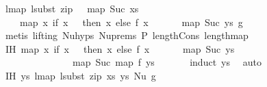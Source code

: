 \begin{isabellebody}
\ lmap\ {\isacharparenleft}{\kern0pt}lsubst\ {\isacharparenleft}{\kern0pt}zip\ {\isacharparenleft}{\kern0pt}{}\ {\isacharhash}{\kern0pt}\ map\ Suc\ xs{\isacharparenright}{\kern0pt}\isanewline
\ \ \ \ {\isacharparenleft}{\kern0pt}map\ {\isacharparenleft}{\kern0pt}{\isasymlambda}x{\isachardot}{\kern0pt}\ if\ x\ {\isacharequal}{\kern0pt}\ {}\ then\ x\ else\ {\isacharparenleft}{\kern0pt}f\ {\isacharparenleft}{\kern0pt}x\ {\isacharminus}{\kern0pt}\ {}{\isacharparenright}{\kern0pt}\ {\isacharplus}{\kern0pt}\ {}{\isacharparenright}{\kern0pt}{\isacharparenright}{\kern0pt}\ {\isacharparenleft}{\kern0pt}{}\ {\isacharhash}{\kern0pt}\ map\ Suc\ ys{\isacharparenright}{\kern0pt}{\isacharparenright}{\kern0pt}{\isacharparenright}{\kern0pt}{\isacharparenright}{\kern0pt}\ g{\isachardoublequoteclose}\isanewline
\ \ \ \isamarkupfalse%
\ {\isacharparenleft}{\kern0pt}metis\ {\isacharparenleft}{\kern0pt}lifting{\isacharparenright}{\kern0pt}\ Nu{\isachardot}{\kern0pt}hyps\ Nu{\isachardot}{\kern0pt}prems{\isacharparenleft}{\kern0pt}{}{\isacharparenright}{\kern0pt}\ P{}\ length{\isacharunderscore}{\kern0pt}Cons\ length{\isacharunderscore}{\kern0pt}map{\isacharparenright}{\kern0pt}\isanewline
\isanewline
\ \ \isamarkupfalse%
\ IH{}{\isacharcolon}{\kern0pt}\ {\isachardoublequoteopen}map\ {\isacharparenleft}{\kern0pt}{\isasymlambda}x{\isachardot}{\kern0pt}\ if\ x\ {\isacharequal}{\kern0pt}\ {}\ then\ x\ else\ {\isacharparenleft}{\kern0pt}f\ {\isacharparenleft}{\kern0pt}x\ {\isacharminus}{\kern0pt}\ {}{\isacharparenright}{\kern0pt}\ {\isacharplus}{\kern0pt}\ {}{\isacharparenright}{\kern0pt}{\isacharparenright}{\kern0pt}\ {\isacharparenleft}{\kern0pt}{}\ {\isacharhash}{\kern0pt}\ map\ Suc\ ys{\isacharparenright}{\kern0pt}\ {\isacharequal}{\kern0pt}\isanewline
\ \ \ \ \ \ \ \ \ \ \ \ \ {}\ {\isacharhash}{\kern0pt}\ map\ Suc\ {\isacharparenleft}{\kern0pt}map\ f\ ys{\isacharparenright}{\kern0pt}{\isachardoublequoteclose}\isanewline
\ \ \ \ \ \isamarkupfalse%
\ {\isacharparenleft}{\kern0pt}induct\ ys{\isacharparenright}{\kern0pt}\ \isamarkupfalse%
\ auto\isanewline
\isanewline
\ \ \ \isamarkupfalse%
\ IH{}{\isacharcolon}{\kern0pt}\ {\isachardoublequoteopen}{\isasymforall}ys{\isachardot}{\kern0pt}\ lmap\ {\isacharparenleft}{\kern0pt}lsubst\ {\isacharparenleft}{\kern0pt}zip\ xs\ ys{\isacharparenright}{\kern0pt}{\isacharparenright}{\kern0pt}\ {\isacharparenleft}{\kern0pt}Nu\ g{\isacharparenright}{\kern0pt}\ {\isacharequal}{\kern0pt}\isanewline

\end{isabellebody}
